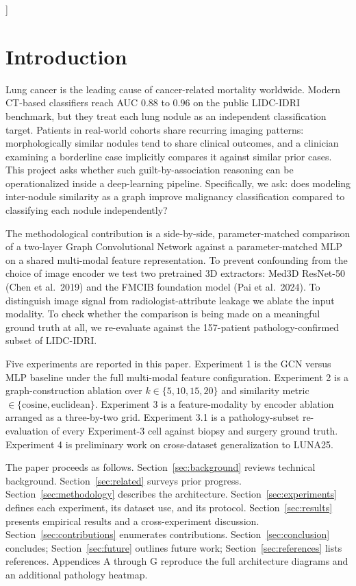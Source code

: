 \documentclass[10pt,letterpaper,twocolumn]{article}
\begin{document}
\begin{center}
\begin{minipage}{0.92\textwidth}
\end{minipage}
\end{center}
\vspace{0.8em}
]

\section{Introduction}
\label{sec:intro}

Lung cancer is the leading cause of cancer-related mortality worldwide. Modern CT-based classifiers reach AUC $0.88$ to $0.96$ on the public LIDC-IDRI benchmark, but they treat each lung nodule as an independent classification target. Patients in real-world cohorts share recurring imaging patterns: morphologically similar nodules tend to share clinical outcomes, and a clinician examining a borderline case implicitly compares it against similar prior cases. This project asks whether such guilt-by-association reasoning can be operationalized inside a deep-learning pipeline. Specifically, we ask: does modeling inter-nodule similarity as a graph improve malignancy classification compared to classifying each nodule independently?

The methodological contribution is a side-by-side, parameter-matched comparison of a two-layer Graph Convolutional Network against a parameter-matched MLP on a shared multi-modal feature representation. To prevent confounding from the choice of image encoder we test two pretrained 3D extractors: Med3D ResNet-50 (Chen et al.\ 2019) and the FMCIB foundation model (Pai et al.\ 2024). To distinguish image signal from radiologist-attribute leakage we ablate the input modality. To check whether the comparison is being made on a meaningful ground truth at all, we re-evaluate against the 157-patient pathology-confirmed subset of LIDC-IDRI.

Five experiments are reported in this paper. Experiment 1 is the GCN versus MLP baseline under the full multi-modal feature configuration. Experiment 2 is a graph-construction ablation over $k \in \{5, 10, 15, 20\}$ and similarity metric $\in \{\text{cosine}, \text{euclidean}\}$. Experiment 3 is a feature-modality by encoder ablation arranged as a three-by-two grid. Experiment 3.1 is a pathology-subset re-evaluation of every Experiment-3 cell against biopsy and surgery ground truth. Experiment 4 is preliminary work on cross-dataset generalization to LUNA25.

The paper proceeds as follows. Section~\ref{sec:background} reviews technical background. Section~\ref{sec:related} surveys prior progress. Section~\ref{sec:methodology} describes the architecture. Section~\ref{sec:experiments} defines each experiment, its dataset use, and its protocol. Section~\ref{sec:results} presents empirical results and a cross-experiment discussion. Section~\ref{sec:contributions} enumerates contributions. Section~\ref{sec:conclusion} concludes; Section~\ref{sec:future} outlines future work; Section~\ref{sec:references} lists references. Appendices A through G reproduce the full architecture diagrams and an additional pathology heatmap.
\end{document}
